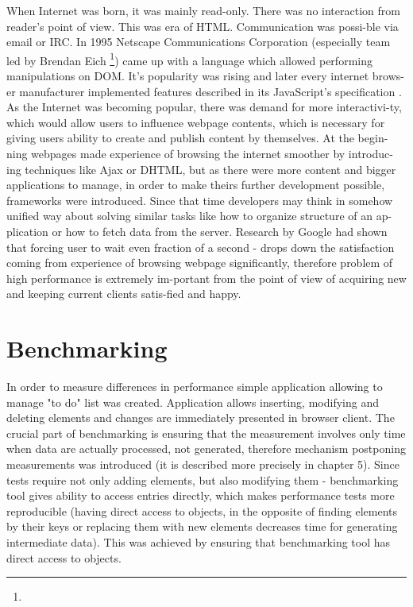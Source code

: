 \documentclass[inzynier,druk,ramka]{build/dyplom}
\begin{document}
When Internet was born, it was mainly read-only. There was no interaction from reader’s point of view. This was era of HTML. Communication was possi-ble via email or IRC. In 1995 Netscape Communications Corporation (especially team led by Brendan Eich \footnote{}) came up with a language which allowed performing manipulations on DOM. It’s popularity was rising and later every internet brows-er manufacturer implemented features described in its JavaScript’s specification  . As the Internet was becoming popular, there was demand for more interactivi-ty, which would allow users to influence webpage contents, which is necessary for giving users ability to create and publish content by themselves. At the begin-ning webpages made experience of browsing the internet smoother by introduc-ing techniques like Ajax or DHTML, but as there were more content and bigger applications to manage, in order to make theirs further development possible, frameworks were introduced. Since that time developers may think in somehow unified way about solving similar tasks like how to organize structure of an ap-plication or how to fetch data from the server.
Research by Google  had shown that forcing user to wait even fraction of a second - drops down the satisfaction coming from experience of browsing webpage significantly, therefore problem of high performance is extremely im-portant from the point of view of acquiring new and keeping current clients satis-fied and happy.

\section{Benchmarking}
In order to measure differences in performance simple application allowing to manage "to do" list was created. Application allows inserting, modifying and deleting elements and changes are immediately presented in browser client.
The crucial part of benchmarking is ensuring that the measurement involves only time when data are actually processed, not generated, therefore mechanism postponing measurements was introduced (it is described more precisely in chapter 5). Since tests require not only adding elements, but also modifying them - benchmarking tool gives ability to access entries directly, which makes performance tests more reproducible (having direct access to objects, in the opposite of finding elements by their keys or replacing them with new elements decreases time for generating intermediate data). This was achieved by ensuring that benchmarking tool has direct access to objects.
\end{document}
